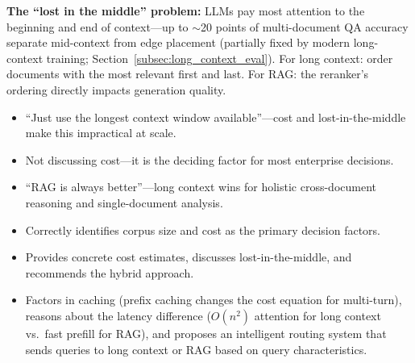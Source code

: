 \begin{interviewq}
\textbf{The ``lost in the middle'' problem:} LLMs pay most attention to the beginning and end of context---up to $\sim$20 points of multi-document QA accuracy separate mid-context from edge placement (partially fixed by modern long-context training; Section~\ref{subsec:long_context_eval}). For long context: order documents with the most relevant first and last. For RAG: the reranker's ordering directly impacts generation quality.

\redflags
\begin{itemize}
    \item ``Just use the longest context window available''---cost and lost-in-the-middle make this impractical at scale.
    \item Not discussing cost---it is the deciding factor for most enterprise decisions.
    \item ``RAG is always better''---long context wins for holistic cross-document reasoning and single-document analysis.
\end{itemize}


\goodgreat
\begin{itemize}
    \item {} Correctly identifies corpus size and cost as the primary decision factors.
    \item {} Provides concrete cost estimates, discusses lost-in-the-middle, and recommends the hybrid approach.
    \item {} Factors in caching (prefix caching changes the cost equation for multi-turn), reasons about the latency difference ($O(n^2)$ attention for long context vs.\ fast prefill for RAG), and proposes an intelligent routing system that sends queries to long context or RAG based on query characteristics.
\end{itemize}

\end{interviewq}

